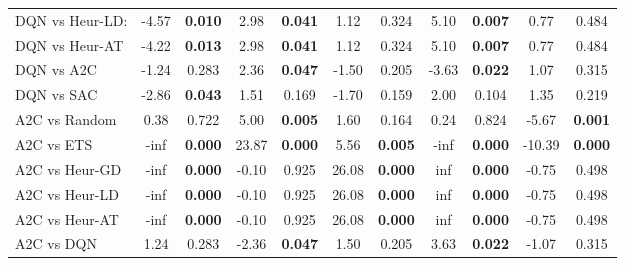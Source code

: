 \begin{tabular}{lcccccccccc}
	DQN vs Heur-LD:  & -4.57          & \textbf{0.010}         & 2.98           & \textbf{0.041}         & 1.12           & 0.324                  & 5.10           & \textbf{0.007}         & 0.77           & 0.484                  \\
	DQN vs Heur-AT   & -4.22          & \textbf{0.013}         & 2.98           & \textbf{0.041}         & 1.12           & 0.324                  & 5.10           & \textbf{0.007}         & 0.77           & 0.484                  \\
	DQN vs A2C       & -1.24          & 0.283                  & 2.36           & \textbf{0.047}         & -1.50          & 0.205                  & -3.63          & \textbf{0.022}         & 1.07           & 0.315                  \\
	DQN vs SAC       & -2.86          & \textbf{0.043}         & 1.51           & 0.169                  & -1.70          & 0.159                  & 2.00           & 0.104                  & 1.35           & 0.219                  \\
	\midrule 
	A2C vs Random    & 0.38           & 0.722                  & 5.00           & \textbf{0.005}         & 1.60           & 0.164                  & 0.24           & 0.824                  & -5.67          & \textbf{0.001}         \\
	A2C vs ETS       & -inf           & \textbf{0.000}         & 23.87          & \textbf{0.000}         & 5.56           & \textbf{0.005}         & -inf           & \textbf{0.000}         & -10.39         & \textbf{0.000}         \\
	A2C vs Heur-GD   & -inf           & \textbf{0.000}         & -0.10          & 0.925                  & 26.08          & \textbf{0.000}         & inf            & \textbf{0.000}         & -0.75          & 0.498                  \\
	A2C vs Heur-LD   & -inf           & \textbf{0.000}         & -0.10          & 0.925                  & 26.08          & \textbf{0.000}         & inf            & \textbf{0.000}         & -0.75          & 0.498                  \\
	A2C vs Heur-AT   & -inf           & \textbf{0.000}         & -0.10          & 0.925                  & 26.08          & \textbf{0.000}         & inf            & \textbf{0.000}         & -0.75          & 0.498                  \\
	A2C vs DQN       & 1.24           & 0.283                  & -2.36          & \textbf{0.047}         & 1.50           & 0.205                  & 3.63           & \textbf{0.022}         & -1.07          & 0.315                  \\

\end{tabular}
